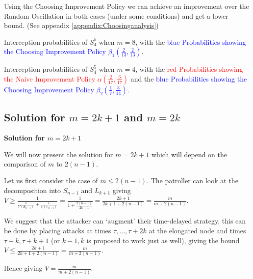 \documentclass[a4paper,10pt]{article}
\theoremstyle{definition}
\theoremstyle{definition}
\theoremstyle{remark}
\theoremstyle{definition}
\begin{document}
Using the Choosing Improvement Policy we can achieve an improvement over the Random Oscillation in both cases (under some conditions) and get a lower bound. (See  appendix \ref{appendix:Choosinganalysis})


\begin{myfigure}
\begin{center}

\end{center}
\caption{Interception probabilities of $S^5_{4}$ when $m=8$, with the \textcolor{blue}{blue Probabilities showing the Choosing Improvement Policy $\beta_{1} \left(\frac{2}{13},\frac{2}{13} \right)$}.}
\end{myfigure}



\begin{myfigure}
\begin{center}

\end{center}
\caption{Interception probabilities of $S^5_{4}$ when $m=4$, with the \textcolor{red}{red Probabilities showing the Naive Improvement Policy $\alpha \left(\frac{2}{17},\frac{6}{17} \right)$} and the \textcolor{blue}{blue Probabilities showing the Choosing Improvement Policy $\beta_{2} \left(\frac{1}{7},\frac{3}{14} \right)$}.}
\end{myfigure}


\subsection{Solution for $m=2k+1$ and $m=2k$}

\textbf{Solution for $m=2k+1$}

We will now present the solution for $m=2k+1$ which will depend on the comparison of $m$ to $2(n-1)$.

Let us first consider the case of $m \leq 2(n-1)$.
The patroller can look at the decomposition into $S_{n-1}$ and $L_{k+1}$ giving $V \geq \frac{1}{\frac{1}{V(S_{n-1})}+\frac{1}{V(L_{k+1})}}=\frac{1}{1+\frac{2(n-1)}{2k+1}}=\frac{2k+1}{2k+1+2(n-1)}=\frac{m}{m+2(n-1)}$.

We suggest that the attacker can `augment' their time-delayed strategy, this can be done by placing attacks at times $\tau,...,\tau+2k$ at the elongated node and times $\tau+k,\tau+k+1$ (or $k-1,k$ is proposed to work just as well), giving the bound $V \leq \frac{2k+1}{2k+1+2(n-1)}=\frac{m}{m+2(n-1)}$.

Hence giving $V=\frac{m}{m+2(n-1)}$.
\end{document}
